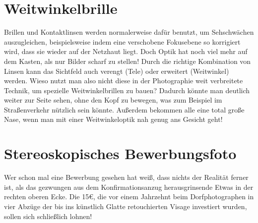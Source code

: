 \documentclass[a5paper,pagesize,10pt,bibtotoc,pointlessnumbers,normalheadings,DIV=9,twoside=false]{scrbook}
\begin{document}


\chapter{Weitwinkelbrille}

Brillen und Kontaktlinsen werden normalerweise dafür benutzt, um Sehschwächen auszugleichen, beispielsweise indem eine verschobene Fokusebene so korrigiert wird, dass sie wieder auf der Netzhaut liegt.
Doch Optik hat noch viel mehr auf dem Kasten, als nur Bilder scharf zu stellen!
Durch die richtige Kombination von Linsen kann das Sichtfeld auch verengt (Tele) oder erweitert (Weitwinkel) werden.
Wieso nutzt man also nicht diese in der Photographie weit verbreitete Technik, um spezielle Weitwinkelbrillen zu bauen?
Dadurch könnte man deutlich weiter zur Seite sehen, ohne den Kopf zu bewegen, was zum Beispiel im Straßenverkehr nützlich sein könnte.
Außerdem bekommen alle eine total große Nase, wenn man mit einer Weitwinkeloptik nah genug ans Gesicht geht!


\chapter{Stereoskopisches Bewerbungsfoto}

Wer schon mal eine Bewerbung gesehen hat weiß, dass nichts der Realität ferner ist, als das gezwungen aus dem Konfirmationsanzug herausgrinsende Etwas in der rechten oberen Ecke.
Die 15€, die vor einem Jahrzehnt beim Dorfphotographen in vier Abzüge der bis ins künstlich Glatte retouchierten Visage investiert wurden, sollen sich schließlich lohnen!
\end{document}
